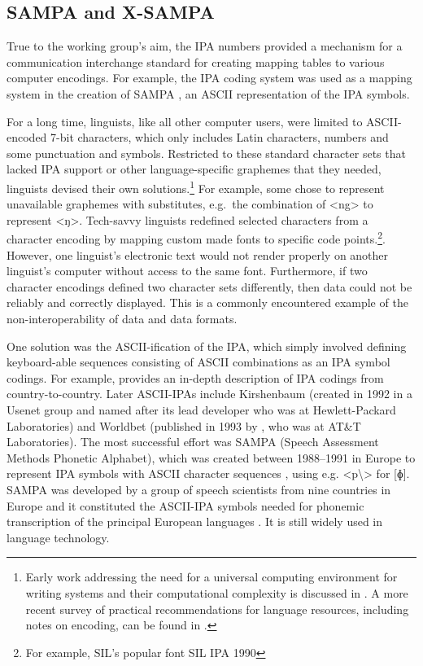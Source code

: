 \subsection*{SAMPA and X-SAMPA}
\label{sampa-xsampa}

True to the working group's aim, the IPA numbers provided a mechanism for 
a communication interchange standard for creating mapping tables to various 
computer encodings. For example, the IPA coding system was used as a mapping 
system in the creation of SAMPA \citep{Wells_etal1992}, an ASCII representation 
of the IPA symbols. 

For a long time, linguists, like all other computer users, were
limited to ASCII-encoded 7-bit characters, which only includes Latin characters,
numbers and some punctuation and symbols. Restricted to these standard character
sets that lacked IPA support or other language-specific graphemes that they
needed, linguists devised their own solutions.\footnote{Early work addressing
the need for a universal computing environment for writing systems and their
computational complexity is discussed in \citet{Simons1989}. A more recent survey of
practical recommendations for language resources, including notes on encoding,
can be found in \citet{BirdSimons2003}.} For example, some chose to represent
unavailable graphemes with substitutes, e.g.~the combination of <ng> to
represent <ŋ>. Tech-savvy linguists redefined selected characters from a
character encoding by mapping custom made fonts to specific code points.\footnote{For 
example, SIL's popular font SIL IPA 1990}. However,
one linguist's electronic text would not render properly on another linguist's
computer without access to the same font. Furthermore, if two character encodings
defined two character sets differently, then data could not be reliably and
correctly displayed. This is a commonly encountered example of the non-interoperability of
data and data formats.

One solution was the ASCII-ification of the IPA, which simply involved 
defining keyboard-able sequences consisting of ASCII combinations as an IPA symbol
codings. For example, \cite{Wells1987} provides an in-depth description of IPA
codings from country-to-country. Later ASCII-IPAs include Kirshenbaum (created
in 1992 in a Usenet group and named after its lead developer who was at
Hewlett-Packard Laboratories) and Worldbet (published in 1993 by
\cite{Hieronymus1993}, who was at AT\&T Laboratories). 
The most successful effort was SAMPA (Speech Assessment
Methods Phonetic Alphabet), which was created between 1988--1991 in Europe to 
represent IPA symbols with ASCII
character sequences \citep{Wells1987,Wells_etal1992}, using e.g. <p\textbackslash> 
for [ɸ]. SAMPA was developed by a group of speech scientists from nine countries 
in Europe and it constituted the ASCII-IPA symbols needed for phonemic transcription 
of the principal European languages \citep{Wells1995}. It is still widely 
used in language technology.

